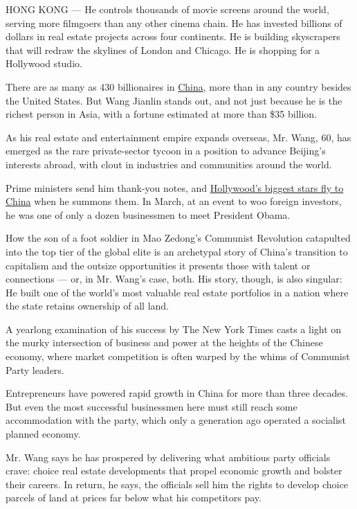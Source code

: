 HONG KONG --- He controls thousands of movie screens around the world,
serving more filmgoers than any other cinema chain. He has invested
billions of dollars in real estate projects across four continents. He
is building skyscrapers that will redraw the skylines of London and
Chicago. He is shopping for a Hollywood studio.

There are as many as 430 billionaires in
\href{http://topics.nytimes3xbfgragh.onion/top/news/international/countriesandterritories/china/index.html?inline=nyt-geo}{China},
more than in any country besides the United States. But Wang Jianlin
stands out, and not just because he is the richest person in Asia, with
a fortune estimated at more than \$35 billion.

As his real estate and entertainment empire expands overseas, Mr. Wang,
60, has emerged as the rare private-sector tycoon in a position to
advance Beijing's interests abroad, with clout in industries and
communities around the world.

Prime ministers send him thank-you notes, and
\href{http://www.nytimes3xbfgragh.onion/2013/09/23/business/global/chinese-titan-takes-aim-at-hollywood.html}{Hollywood's
biggest stars fly to China} when he summons them. In March, at an event
to woo foreign investors, he was one of only a dozen businessmen to meet
President Obama.

How the son of a foot soldier in Mao Zedong's Communist Revolution
catapulted into the top tier of the global elite is an archetypal story
of China's transition to capitalism and the outsize opportunities it
presents those with talent or connections --- or, in Mr. Wang's case,
both. His story, though, is also singular: He built one of the world's
most valuable real estate portfolios in a nation where the state retains
ownership of all land.

A yearlong examination of his success by The New York Times casts a
light on the murky intersection of business and power at the heights of
the Chinese economy, where market competition is often warped by the
whims of Communist Party leaders.

Entrepreneurs have powered rapid growth in China for more than three
decades. But even the most successful businessmen here must still reach
some accommodation with the party, which only a generation ago operated
a socialist planned economy.

Mr. Wang says he has prospered by delivering what ambitious party
officials crave: choice real estate developments that propel economic
growth and bolster their careers. In return, he says, the officials sell
him the rights to develop choice parcels of land at prices far below
what his competitors pay.

